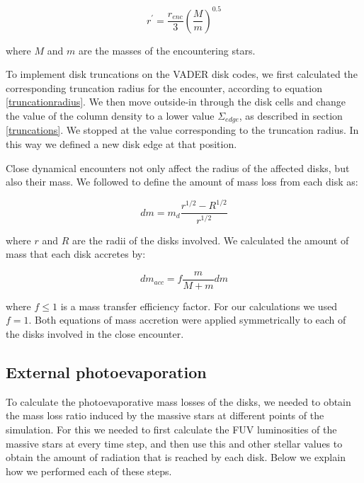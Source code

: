 \documentclass[fleqn,usenatbib]{mnras}
\begin{document}
\begin{equation}\label{truncationradius}
{r^\prime} = \frac{r_{enc}}{3}\left(\frac{M}{m}\right)^{0.5}
\end{equation}

\noindent 
where $M$ and $m$ are the masses of the encountering stars.

To implement disk truncations on the VADER disk codes, we first calculated the corresponding truncation radius for the encounter, according to equation \ref{truncationradius}. We then move outside-in through the disk cells and change the value of the column density to a lower value $\Sigma_{edge}$, as described in section \ref{truncations}. We stopped at the value corresponding to the truncation radius. In this way we defined a new disk edge at that position.

Close dynamical encounters not only affect the radius of the affected disks, but also their mass. We followed \citet{portegieszwart2016} to define the amount of mass loss from each disk as:

\begin{equation}
dm = m_{d}\frac{r^{1/2} - R^{1/2}}{r^{1/2}}
\end{equation}

\noindent
where $r$ and $R$ are the radii of the disks involved. We calculated the amount of mass that each disk accretes by:

\begin{equation}\label{accmass}
dm_{acc} = f \frac{m}{M + m} dm
\end{equation}

\noindent
where $f \leq 1$ is a mass transfer efficiency factor. For our calculations we used $f = 1$. Both equations of mass accretion were applied symmetrically to each of the disks involved in the close encounter.

\subsection{External photoevaporation}\label{photoevaporation}
To calculate the photoevaporative mass losses of the disks, we needed to obtain the mass loss ratio induced by the massive stars at different points of the simulation. For this we needed to first calculate the FUV luminosities of the massive stars at every time step, and then use this and other stellar values to obtain the amount of radiation that is reached by each disk. Below we explain how we performed each of these steps. 
\end{document}
